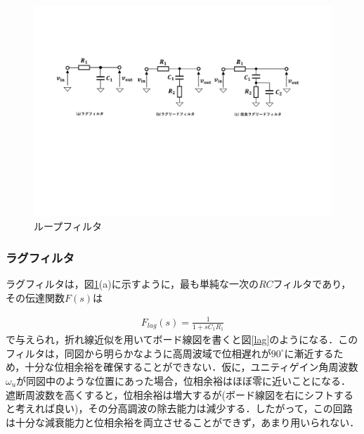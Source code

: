 \begin{figure}[t]
\begin{center}

\includegraphics[width=150mm]{figures/filter.pdf}
\caption{ループフィルタ}
\label{filter}

\end{center}
\end{figure}

\subsubsection{ラグフィルタ}
ラグフィルタは，図\ref{filter}(a)に示すように，最も単純な一次の$RC$フィルタであり，その伝達関数$F(s)$は

\begin{align}
F_{lag}(s)=\frac{1}{1+sC_1R_1}
\end{align}
で与えられ，折れ線近似を用いてボード線図を書くと図\ref{lag}のようになる．このフィルタは，同図から明らかなように高周波域で位相遅れが$90 ^ \circ$に漸近するため，十分な位相余裕を確保することができない．仮に，ユニティゲイン角周波数$\omega_u$が同図中のような位置にあった場合，位相余裕はほぼ零に近いことになる．遮断周波数を高くすると，位相余裕は増大するが(ボード線図を右にシフトすると考えれば良い)，その分高調波の除去能力は減少する．したがって，この回路は十分な減衰能力と位相余裕を両立させることができず，あまり用いられない\cite{Yanagisawa1998}．

